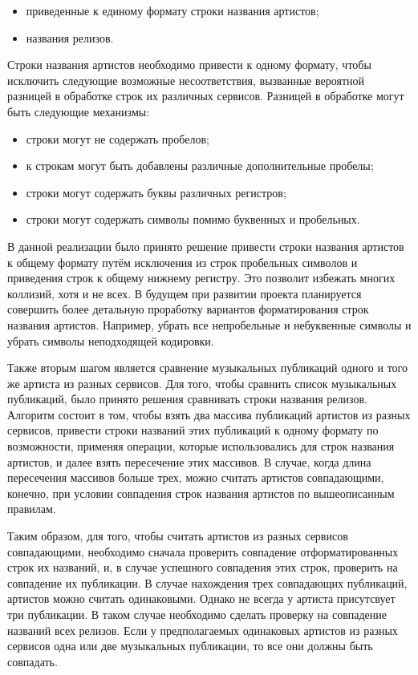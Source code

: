 \begin{itemize}
  \item приведенные к единому формату строки названия артистов;
  \item названия релизов.
\end{itemize}

Строки названия артистов необходимо привести к одному формату, чтобы исключить следующие возможные несоответствия, вызванные вероятной разницей в обработке строк их различных сервисов. Разницей в обработке могут быть следующие механизмы:

\begin{itemize}
  \item строки могут не содержать пробелов;
  \item к строкам могут быть добавлены различные дополнительные пробелы;
  \item строки могут содержать буквы различных регистров;
  \item строки могут содержать символы помимо буквенных и пробельных.
\end{itemize}

В данной реализации было принято решение привести строки названия артистов к общему формату путём исключения из строк пробельных символов и приведения строк к общему нижнему регистру. Это позволит избежать многих коллизий, хотя и не всех. В будущем при развитии проекта планируется совершить более детальную проработку вариантов форматирования строк названия артистов. Например, убрать все непробельные и небуквенные символы и убрать символы неподходящей кодировки.

Также вторым шагом является сравнение музыкальных публикаций одного и того же артиста из разных сервисов. Для того, чтобы сравнить список музыкальных публикаций, было принято решения сравнивать строки названия релизов. Алгоритм состоит в том, чтобы взять два массива публикаций артистов из разных сервисов, привести строки названий этих публикаций к одному формату по возможности, применяя операции, которые использовались для строк названия артистов, и далее взять пересечение этих массивов. В случае, когда длина пересечения массивов больше трех, можно считать артистов совпадающими, конечно, при условии совпадения строк названия артистов по вышеописанным правилам.

Таким образом, для того, чтобы считать артистов из разных сервисов совпадающими, необходимо сначала проверить совпадение отформатированных строк их названий, и, в случае успешного совпадения этих строк, проверить на совпадение их публикации. В случае нахождения трех совпадающих публикаций, артистов можно считать одинаковыми. Однако не всегда у артиста присутсвует три публикации. В таком случае необходимо сделать проверку на совпадение названий всех релизов. Если у предполагаемых одинаковых артистов из разных сервисов одна или две музыкальных публикации, то все они должны быть совпадать.

